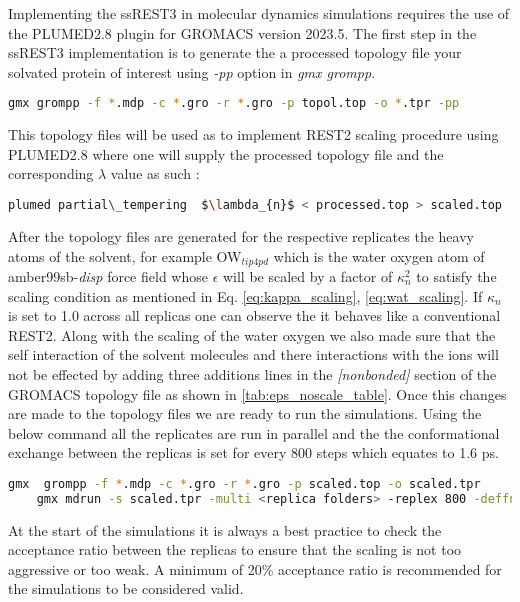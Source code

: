 
Implementing the ssREST3 in molecular dynamics simulations requires the use of the PLUMED2.8 plugin for GROMACS version 2023.5. 
The first step in the ssREST3 implementation is to generate the a processed topology file your solvated protein of interest using \textit{-pp} option in \textit{gmx grompp}.

\begin{lstlisting}[language=sh, basicstyle=\ttfamily\small, breaklines=true]
    gmx grompp -f *.mdp -c *.gro -r *.gro -p topol.top -o *.tpr -pp
\end{lstlisting}

This topology files will be used as to implement REST2 scaling procedure using PLUMED2.8 where one will supply the processed topology file and the corresponding $\lambda$ value as such :

\begin{lstlisting}[language=sh, basicstyle=\ttfamily\small, breaklines=true]
    plumed partial\_tempering  $\lambda_{n}$ < processed.top > scaled.top
\end{lstlisting}

After the topology files are generated for the respective replicates the heavy atoms 
of the solvent, for example OW$_{tip4pd}$ which is the water oxygen atom of amber99sb-\textit{disp} force field whose $\epsilon$ will be scaled by a factor of $\kappa^{2}_{n}$ to satisfy the scaling condition 
as mentioned in Eq. \ref{eq:kappa_scaling}, \ref{eq:wat_scaling}. 
If $\kappa_{n}$ is set to 1.0 across all replicas one can observe the it behaves like a conventional REST2. 
Along with the scaling of the water oxygen we also made sure that the self interaction of the solvent molecules and there interactions with the ions will not be effected by adding three additions lines in the \textit{[nonbonded]} section of the GROMACS topology file as shown in \ref{tab:eps_noscale_table}.
Once this changes are made to the topology files we are ready to run the simulations.
Using the below command all the replicates are run in parallel and the the conformational exchange between the replicas is set for every 800 steps which equates to 1.6 ps.

\begin{lstlisting}[language=sh, basicstyle=\ttfamily\small, breaklines=true]
    gmx  grompp -f *.mdp -c *.gro -r *.gro -p scaled.top -o scaled.tpr
    gmx mdrun -s scaled.tpr -multi <replica folders> -replex 800 -deffnm replica -plumed plumed.dat
\end{lstlisting}


At the start of the simulations it is always a best practice to check the acceptance ratio between the replicas to ensure that the scaling is not too aggressive or too weak. 
A minimum of 20\% acceptance ratio is recommended for the simulations to be considered valid.
